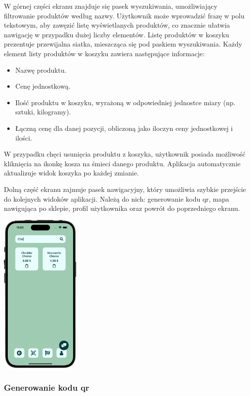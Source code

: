 W górnej części ekranu znajduje się pasek wyszukiwania, umożliwiający filtrowanie produktów według nazwy. Użytkownik może wprowadzić frazę w polu tekstowym, aby zawęzić listę wyświetlanych produktów, co znacznie ułatwia nawigację w przypadku dużej liczby elementów. Listę produktów w koszyku prezentuje przewijalna siatka, mieszcząca się pod paskiem wyszukiwania. Każdy element listy produktów w koszyku zawiera następujące informacje:
\begin{itemize}
    \item Nazwę produktu.
    \item Cenę jednostkową.
    \item Ilość produktu w koszyku, wyrażoną w odpowiedniej jednostce miary (np. sztuki, kilogramy).
    \item Łączną cenę dla danej pozycji, obliczoną jako iloczyn ceny jednostkowej i ilości.
\end{itemize}

W przypadku chęci usunięcia produktu z koszyka, użytkownik posiada możliwość kliknięcia na ikonkę kosza na śmieci danego produktu. Aplikacja automatycznie aktualizuje widok koszyka po każdej zmianie.

Dolną część ekranu zajmuje pasek nawigacyjny, który umożliwia szybkie przejście do kolejnych widoków aplikacji. Należą do nich: generowanie kodu qr, mapa nawigująca po sklepie, profil użytkownika oraz powrót do poprzedniego ekranu.

\begin{center}
    \includegraphics[width=0.3\textwidth]{images/front/cart_filtered.png}
\end{center}


\subsubsection{Generowanie kodu qr}


